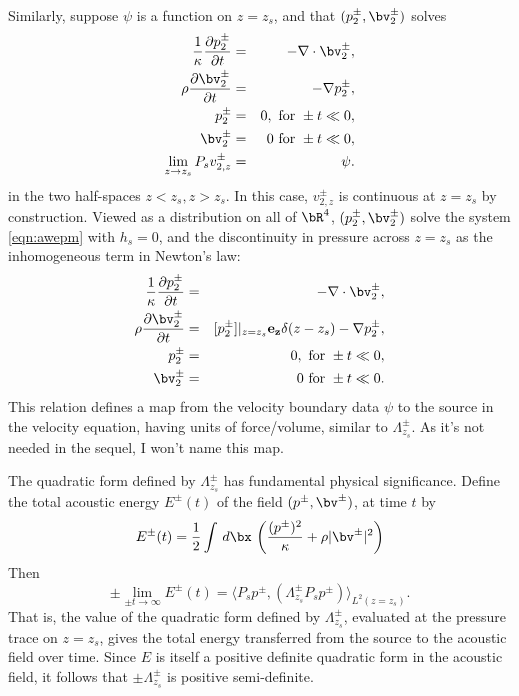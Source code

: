 Similarly, suppose $\psi$ is a function on $z=z_s$, and that
$(p^{\pm}_2,\bv^{\pm}_2)$ solves
\begin{eqnarray}
\label{eqn:awe2}
  \frac{1}{\kappa}\frac{\partial p^{\pm}_2}{\partial t} & = & - \nabla \cdot \bv^{\pm}_2, \nonumber \\
  \rho\frac{\partial \bv^{\pm}_2}{\partial t} & = & - \nabla p^{\pm}_2,\nonumber \\
  p^{\pm}_2 & =& 0,  \mbox{ for } \pm t \ll 0,\nonumber\\ 
  \bv^{\pm}_2 & = & 0 \mbox{ for } \pm t \ll 0,\nonumber\\
  \lim_{z \rightarrow z_s} P_sv^{\pm}_{2,z} &=& \psi.
\end{eqnarray}
in the two half-spaces $z<z_s, z > z_s$. In this case, $v^{\pm}_{2,z}$
is continuous at $z=z_s$ by construction. Viewed as a
distribution on all of $\bR^4$, $(p^{\pm}_2,\bv^{\pm}_2)$ solve the
system \ref{eqn:awepm} with $h_s=0$, and the discontinuity in pressure
across $z=z_s$ as the inhomogeneous term in Newton's law:
\begin{eqnarray}
\label{eqn:sawe2}
  \frac{1}{\kappa}\frac{\partial p^{\pm}_2}{\partial t} & = &
                                                        - \nabla \cdot \bv^{\pm}_2, \nonumber \\
  \rho\frac{\partial \bv^{\pm}_2}{\partial t} & = & 
                                                    [p^{\pm}_2]|_{z=z_s}{\bf e_z}\delta(z-z_s) - \nabla p^{\pm}_2,\nonumber \\
  p^{\pm}_2 & =& 0,  \mbox{ for } \pm t \ll 0,\nonumber\\ 
  \bv^{\pm}_2 & = & 0 \mbox{ for } \pm t \ll 0.
\end{eqnarray}
This relation defines a map from the velocity boundary data $\psi$ to
the source in the velocity equation, having units of force/volume,
similar to $\Lambda^{\pm}_{z_s}$. As it's not needed in the sequel, I
won't name this map.

The quadratic form defined by $\Lambda^{\pm}_{z_s}$ has fundamental
physical significance. Define the total acoustic energy $E^{\pm}(t)$ of the
field $(p^{\pm},\bv^{\pm})$, at time $t$ by
\begin{equation}
  \label{eqn:defae0}
  E^{\pm}(t) = \frac{1}{2} \int \,d\bx \, \left(\frac{(p^{\pm})^2}{\kappa} + \rho |\bv^{\pm}|^2\right)
\end{equation}
Then
\begin{equation}
  \label{eqn:elim}
  \pm \lim_{\pm t \rightarrow \infty} E^{\pm}(t) =  \langle P_sp^{\pm},
  (\Lambda^{\pm}_{z_s} P_sp^{\pm}) \rangle_{L^2(z=z_s)}.
\end{equation}
That is, the value of the quadratic form defined by
$\Lambda^{\pm}_{z_s}$, evaluated at the pressure trace on $z=z_s$,
gives the total energy transferred from the source to the
acoustic field over time. Since $E$ is itself a positive definite
quadratic form in the acoustic field, it follows that $\pm
\Lambda^{\pm}_{z_s}$ is positive semi-definite.

